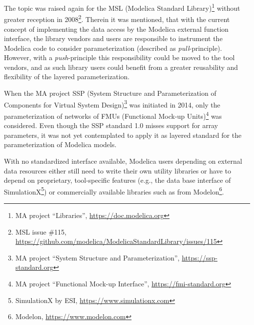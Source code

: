 \documentclass{modelica}
\newcommand{\modelica}[1]{\code{#1}}
\begin{document}
The topic was raised again for the MSL (Modelica Standard Library)\footnote{MA project ``Libraries'', \url{https://doc.modelica.org}} without greater reception in 2008\footnote{MSL issue \#115, \url{https://github.com/modelica/ModelicaStandardLibrary/issues/115}}. Therein it was mentioned, that with the current concept of implementing the data access by the Modelica external function interface, the library vendors and users are responsible to instrument the Modelica code to consider parameterization (described as \emph{pull}-principle). However, with a \emph{push}-principle this responsibility could be moved to the tool vendors, and as such library users could benefit from a greater reusability and flexibility of the layered parameterization.

When the MA project SSP (System Structure and Parameterization of Components for Virtual System Design)\footnote{MA project ``System Structure and Parameterization'', \url{https://ssp-standard.org}} was initiated in 2014, only the parameterization of networks of FMUs (Functional Mock-up Units)\footnote{MA project ``Functional Mock-up Interface'', \url{https://fmi-standard.org}} was considered. Even though the SSP standard 1.0 misses support for array parameters, it was not yet contemplated to apply it as layered standard for the parameterization of Modelica models.

With no standardized interface available, Modelica users depending on external data resources either still need to write their own utility libraries or have to depend on proprietary, tool-specific features (e.g., the data base interface of SimulationX\footnote{SimulationX by ESI,
\url{https://www.simulationx.com}}) or commercially available libraries such as \modelica{Modelon.DataAccess} from Modelon\footnote{Modelon, \url{https://www.modelon.com}}.

\medskip
\end{document}
